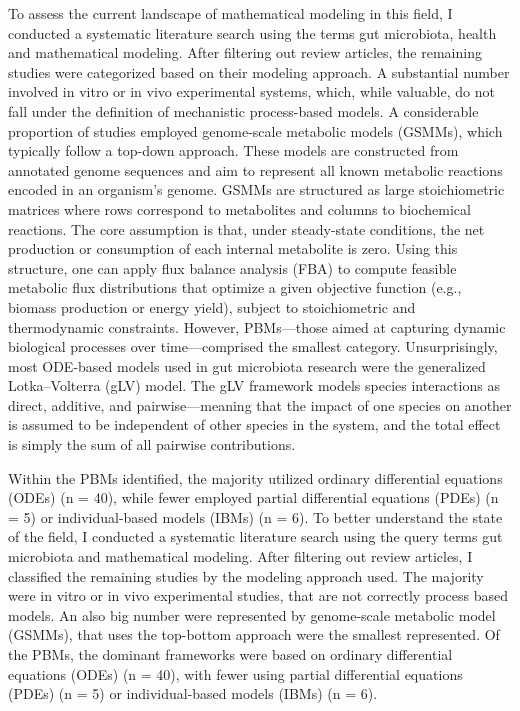\documentclass[11pt,a4paper,fleqn]{article}
\begin{document}
To assess the current landscape of mathematical modeling in this field, 
I conducted a systematic literature search using the terms gut microbiota, health 
and mathematical modeling. After filtering out review articles, 
the remaining studies were categorized based on their modeling approach. 
A substantial number involved in vitro or in vivo experimental systems, 
which, while valuable, do not fall under the definition of mechanistic 
process-based models. 
A considerable proportion of studies employed genome-scale metabolic models (GSMMs), 
which typically follow a top-down approach. These models are constructed from annotated genome 
sequences and aim to represent all known metabolic reactions encoded in an organism’s genome.
GSMMs are structured as large stoichiometric matrices where rows correspond to metabolites and columns to biochemical reactions. 
The core assumption is that, under steady-state conditions, 
the net production or consumption of each internal metabolite is zero. 
Using this structure, one can apply flux balance analysis (FBA) to compute 
feasible metabolic flux distributions that optimize a given objective function (e.g., biomass production or energy yield), 
subject to stoichiometric and thermodynamic constraints.
However, PBMs—those aimed at capturing dynamic biological processes over time—comprised the smallest category.
Unsurprisingly, most ODE-based models used in gut microbiota research were the generalized Lotka–Volterra (gLV) model.
The gLV framework models species interactions as direct, additive, and pairwise—meaning that the impact of one species
 on another is assumed to be independent of other species in the system, and the total effect is simply the sum of all pairwise contributions.

Within the PBMs identified, the majority utilized ordinary differential equations (ODEs) (n = 40), while fewer employed partial differential equations (PDEs) (n = 5) or individual-based models (IBMs) (n = 6).
\indent To better understand the state of the field,
I conducted a systematic literature search using
the query terms gut microbiota and mathematical modeling.
After filtering out review articles, I classified the remaining studies
by the modeling approach used.
The majority were in vitro or in vivo experimental studies, that are not correctly process based models.
An also big number were represented by genome-scale metabolic model (GSMMs), that uses the 
top-bottom approach were the smallest represented.
Of the PBMs, the dominant frameworks were based on ordinary differential equations (ODEs) (n = 40), with fewer using partial differential equations (PDEs) (n = 5) or individual-based models (IBMs) (n = 6).
\end{document}
